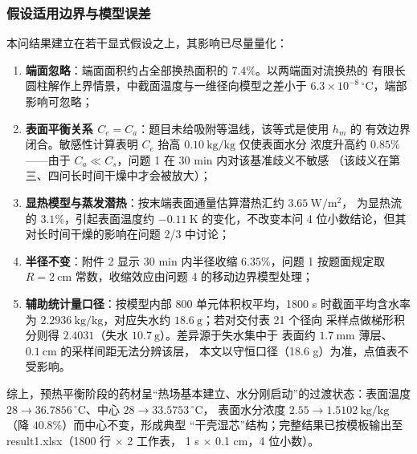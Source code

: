 \documentclass{ctexart}
\begin{document}
\subsubsection{假设适用边界与模型误差}

本问结果建立在若干显式假设之上，其影响已尽量量化：
\begin{enumerate}
  \item \textbf{端面忽略}：端面面积约占全部换热面积的 $7.4\%$。以两端面对流换热的
        有限长圆柱解作上界情景，中截面温度与一维径向模型之差小于
        $6.3\times10^{-8}\,^{\circ}\mathrm{C}$，端部影响可忽略；
  \item \textbf{表面平衡关系 $C_e=C_a$}：题目未给吸附等温线，该等式是使用 $h_m$ 的
        有效边界闭合。敏感性计算表明 $C_e$ 抬高 $0.10\ \mathrm{kg/kg}$ 仅使表面水分
        浓度升高约 $0.85\%$——由于 $C_a\ll C_s$，问题 1 在 30 min 内对该基准歧义不敏感
        （该歧义在第三、四问长时间干燥中才会被放大）；
  \item \textbf{显热模型与蒸发潜热}：按末端表面通量估算潜热汇约 $3.65\ \mathrm{W/m^2}$，
        为显热流的 $3.1\%$，引起表面温度约 $-0.11\ \mathrm{K}$ 的变化，不改变本问
        4 位小数结论，但其对长时间干燥的影响在问题 2/3 中讨论；
  \item \textbf{半径不变}：附件 2 显示 30 min 内半径收缩 $6.35\%$，问题 1 按题面规定取
        $R=2\ \mathrm{cm}$ 常数，收缩效应由问题 4 的移动边界模型处理；
  \item \textbf{辅助统计量口径}：按模型内部 800 单元体积权平均，1800 s 时截面平均含水率为
        $2.2936\ \mathrm{kg/kg}$，对应失水约 $18.6\ \mathrm{g}$；若对交付表 21 个径向
        采样点做梯形积分则得 $2.4031$（失水 $10.7\ \mathrm{g}$）。差异源于失水集中于
        表面约 $1.7\ \mathrm{mm}$ 薄层、$0.1\ \mathrm{cm}$ 的采样间距无法分辨该层，
        本文以守恒口径（18.6 g）为准，点值表不受影响。
\end{enumerate}

综上，预热平衡阶段的药材呈“热场基本建立、水分刚启动”的过渡状态：表面温度
$28\to36.7856\,^{\circ}\mathrm{C}$、中心 $28\to33.5753\,^{\circ}\mathrm{C}$，
表面水分浓度 $2.55\to1.5102\ \mathrm{kg/kg}$（降 $40.8\%$）而中心不变，形成典型
“干壳湿芯”结构；完整结果已按模板输出至 result1.xlsx（1800 行 $\times$ 2 工作表，
1 s $\times$ 0.1 cm，4 位小数）。



\end{document}

